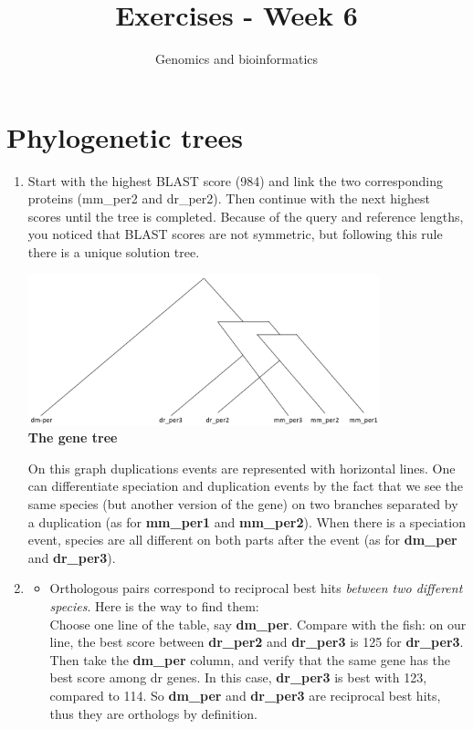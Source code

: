 \documentclass[a4paper,11pt]{article}
\title{Exercises - Week 6}
\date{}
\author{Genomics and bioinformatics}
\begin{document}
\maketitle

\section{Phylogenetic trees}

\begin{enumerate}
\item Start with the highest BLAST score (984) and link the two corresponding proteins (mm\_per2 and dr\_per2). Then continue with the next highest scores until the tree is completed. Because of the query and reference lengths, you noticed that BLAST scores are not symmetric, but following this rule there is a unique solution tree. 

\begin{center}
\includegraphics[width=0.8\textwidth]{tree.png}\\
\vspace{0.5cm}
{\bf The gene tree}
\end{center}

On this graph duplications events are represented with horizontal lines.
One can differentiate speciation and duplication events by the fact that we see the same species (but another version of the gene) on two branches separated by a duplication (as for {\bf mm\_per1} and {\bf mm\_per2}). When there is a speciation event, species are all different on both parts after the event (as for {\bf dm\_per} and {\bf dr\_per3}).

\item 
\begin{itemize}
	\item Orthologous pairs correspond to reciprocal best hits \emph{between two different species}. Here is the way to find them:\\
Choose one line of the table, say {\bf dm\_per}. Compare with the fish: on our line, the best score between {\bf dr\_per2} 
and {\bf dr\_per3} is 125 for {\bf dr\_per3}.
Then take the {\bf dm\_per} column, and verify that the same gene has the best score among dr genes. 
In this case, {\bf dr\_per3} is best with 123, compared to 114. So {\bf dm\_per} and {\bf dr\_per3} are reciprocal best hits, thus they are orthologs by definition.


\end{itemize}
\end{enumerate}
\end{document}
